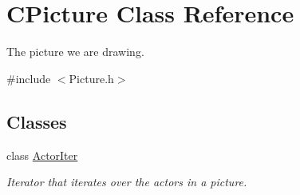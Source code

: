 \hypertarget{class_c_picture}{\section{C\+Picture Class Reference}
\label{class_c_picture}
}


The picture we are drawing.  




{\ttfamily \#include $<$Picture.\+h$>$}

\subsection*{Classes}
\begin{DoxyCompactItemize}
\item 
class \hyperlink{class_c_picture_1_1_actor_iter}{Actor\+Iter}
\begin{DoxyCompactList}\small\item\em Iterator that iterates over the actors in a picture. \end{DoxyCompactList}\end{DoxyCompactItemize}
